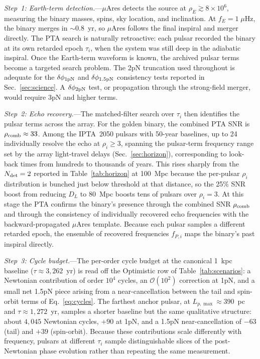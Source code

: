 \documentclass[aps,prx,twocolumn,superscriptaddress,nofootinbib,longbibliography]{revtex4-2}
\begin{document}
\textit{Step~1: Earth-term detection.}---$\mu$Ares detects the source at $\rho_E \gtrsim 8\times10^6$, measuring the binary masses, spins, sky location, and inclination. At $f_E=1\;\mu$Hz, the binary merges in $\sim0.8$~yr, so $\mu$Ares follows the final inspiral and merger directly. The PTA search is naturally retroactive: each pulsar recorded the binary at its own retarded epoch $\tau_i$, when the system was still deep in the adiabatic inspiral. Once the Earth-term waveform is known, the archived pulsar terms become a targeted search problem. The 2pN truncation used throughout is adequate for the $\delta\phi_{1\rm pN}$ and $\delta\phi_{1.5\rm pN}$ consistency tests reported in Sec.~\ref{sec:science}. A $\delta\phi_{2\rm pN}$ test, or propagation through the strong-field merger, would require 3pN and higher terms.

\textit{Step~2: Echo recovery.}---The matched-filter search over $\tau_i$ then identifies the pulsar terms across the array. For the golden binary, the combined PTA SNR is $\rho_{\rm comb}\approx33$. Among the IPTA~2050 pulsars with 50-year baselines, up to 24 individually resolve the echo at $\rho_i \ge 3$, spanning the pulsar-term frequency range set by the array light-travel delays (Sec.~\ref{sec:horizon}), corresponding to look-back times from hundreds to thousands of years. This rises sharply from the $N_{\rm det}=2$ reported in Table~\ref{tab:horizon} at 100~Mpc because the per-pulsar $\rho_i$ distribution is bunched just below threshold at that distance, so the 25\% SNR boost from reducing $D_L$ to 80~Mpc boosts tens of pulsars over $\rho_i = 3$. At this stage the PTA confirms the binary's presence through the combined SNR $\rho_{\rm comb}$ and through the consistency of individually recovered echo frequencies with the backward-propagated $\mu$Ares template. Because each pulsar samples a different retarded epoch, the ensemble of recovered frequencies $f_{P,i}$ maps the binary's past inspiral directly.

\textit{Step~3: Cycle budget.}---The per-order cycle budget at the canonical 1~kpc baseline ($\tau\approx3{,}262$~yr) is read off the Optimistic row of Table~\ref{tab:scenarios}: a Newtonian contribution of order $10^4$ cycles, an $\mathcal{O}(10^2)$ correction at 1pN, and a small net 1.5pN piece arising from a near-cancellation between the tail and spin-orbit terms of Eq.~\eqref{eq:cycles}. The farthest anchor pulsar, at $L_{p,\max}\approx390$~pc and $\tau\approx1{,}272$~yr, samples a shorter baseline but the same qualitative structure: about $4{,}045$ Newtonian cycles, $+90$ at 1pN, and a 1.5pN near-cancellation of $-63$ (tail) and $+39$ (spin-orbit). Because these contributions scale differently with frequency, pulsars at different $\tau_i$ sample distinguishable slices of the post-Newtonian phase evolution rather than repeating the same measurement.
\end{document}

